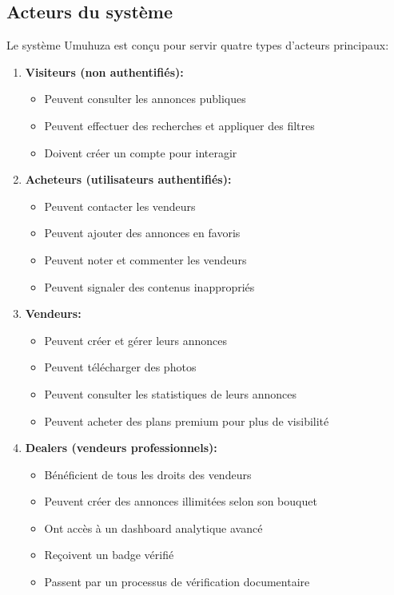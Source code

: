 \documentclass[12pt,a4paper]{report}
\begin{document}
\subsection{Acteurs du système}

Le système Umuhuza est conçu pour servir quatre types d'acteurs principaux:

\begin{enumerate}
    \item \textbf{Visiteurs (non authentifiés):}
    \begin{itemize}
        \item Peuvent consulter les annonces publiques
        \item Peuvent effectuer des recherches et appliquer des filtres
        \item Doivent créer un compte pour interagir
    \end{itemize}

    \item \textbf{Acheteurs (utilisateurs authentifiés):}
    \begin{itemize}
        \item Peuvent contacter les vendeurs
        \item Peuvent ajouter des annonces en favoris
        \item Peuvent noter et commenter les vendeurs
        \item Peuvent signaler des contenus inappropriés
    \end{itemize}

    \item \textbf{Vendeurs:}
    \begin{itemize}
        \item Peuvent créer et gérer leurs annonces
        \item Peuvent télécharger des photos
        \item Peuvent consulter les statistiques de leurs annonces
        \item Peuvent acheter des plans premium pour plus de visibilité
    \end{itemize}

    \item \textbf{Dealers (vendeurs professionnels):}
    \begin{itemize}
        \item Bénéficient de tous les droits des vendeurs
        \item Peuvent créer des annonces illimitées selon son bouquet 
        \item Ont accès à un dashboard analytique avancé
        \item Reçoivent un badge vérifié
        \item Passent par un processus de vérification documentaire
    \end{itemize}


\end{enumerate}
\end{document}

